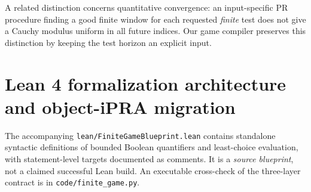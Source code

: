 \documentclass[11pt]{article}
\begin{document}
A related distinction concerns quantitative convergence: an input-specific PR procedure finding a good finite window for each requested \emph{finite} test does not give a Cauchy modulus uniform in all future indices. Our game compiler preserves this distinction by keeping the test horizon an explicit input.

\section{Lean 4 formalization architecture and object-iPRA migration}
The accompanying \texttt{lean/FiniteGameBlueprint.lean} contains standalone syntactic definitions of bounded Boolean quantifiers and least-choice evaluation, with statement-level targets documented as comments. It is a \emph{source blueprint}, not a claimed successful Lean build. An executable cross-check of the three-layer contract is in \texttt{code/finite\_game.py}.
\end{document}
